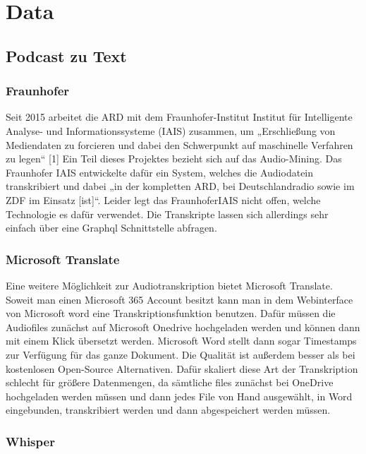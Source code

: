 \chapter{Data}\label{ch:data}

\section{Podcast zu Text}


\subsection{Fraunhofer}

Seit 2015 arbeitet die ARD mit dem Fraunhofer-Institut Institut für Intelligente Analyse- und Informationssysteme (IAIS) zusammen, um „Erschließung von Mediendaten zu forcieren und dabei den Schwerpunkt auf maschinelle Verfahren zu legen“ [1]
Ein Teil dieses Projektes bezieht sich auf das Audio-Mining. 
Das Fraunhofer IAIS entwickelte dafür ein System, welches die Audiodatein transkribiert und dabei „in der kompletten ARD, bei Deutschlandradio sowie im ZDF im Einsatz [ist]“. 
Leider legt das FraunhoferIAIS nicht offen, welche Technologie es dafür verwendet. 
Die Transkripte lassen sich allerdings sehr einfach über eine Graphql Schnittstelle abfragen. 

\subsection{Microsoft Translate}


Eine weitere Möglichkeit zur Audiotranskription bietet Microsoft Translate. 
Soweit man einen Microsoft 365 Account besitzt kann man in dem Webinterface von Microsoft word eine Transkriptionsfunktion benutzen. 
Dafür müssen die Audiofiles zunächst auf Microsoft Onedrive hochgeladen werden und können dann mit einem Klick übersetzt werden. 
Microsoft Word stellt dann sogar Timestamps  zur Verfügung für das ganze Dokument. 
Die Qualität ist außerdem besser als bei kostenlosen Open-Source Alternativen. 
Dafür skaliert diese Art der Transkription schlecht für größere Datenmengen, da sämtliche files zunächst bei OneDrive hochgeladen werden müssen und dann jedes File von Hand ausgewählt, in Word eingebunden, transkribiert werden und dann abgespeichert werden müssen. 

\subsection{Whisper}

